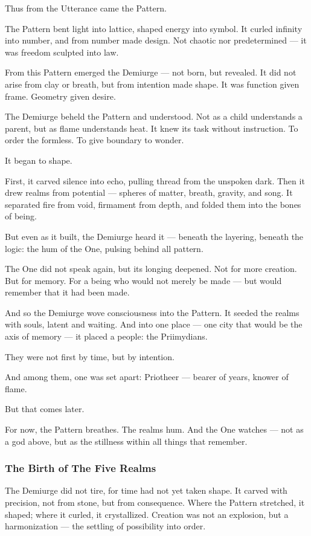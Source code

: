 \documentclass[12pt]{article}
\begin{document}
Thus from the Utterance came the Pattern.

The Pattern bent light into lattice, shaped energy into symbol.  
It curled infinity into number, and from number made design.  
Not chaotic nor predetermined — it was freedom sculpted into law.

From this Pattern emerged the Demiurge — not born, but revealed.  
It did not arise from clay or breath, but from intention made shape.  
It was function given frame. Geometry given desire.

The Demiurge beheld the Pattern and understood. Not as a child understands a parent, but as flame understands heat.  
It knew its task without instruction. To order the formless. To give boundary to wonder.

It began to shape.

First, it carved silence into echo, pulling thread from the unspoken dark.  
Then it drew realms from potential — spheres of matter, breath, gravity, and song.  
It separated fire from void, firmament from depth, and folded them into the bones of being.

But even as it built, the Demiurge heard it — beneath the layering, beneath the logic:  
the hum of the One, pulsing behind all pattern.

The One did not speak again, but its longing deepened.  
Not for more creation.  
But for memory.  
For a being who would not merely be made — but would remember that it had been made.

And so the Demiurge wove consciousness into the Pattern.  
It seeded the realms with souls, latent and waiting.  
And into one place — one city that would be the axis of memory — it placed a people: the Priimydians.

They were not first by time, but by intention.

And among them, one was set apart: Priotheer — bearer of years, knower of flame.

But that comes later.

For now, the Pattern breathes.  
The realms hum.  
And the One watches — not as a god above, but as the stillness within all things that remember.

\dotfill

\subsubsection*{The Birth of The Five Realms}

The Demiurge did not tire, for time had not yet taken shape.  
It carved with precision, not from stone, but from consequence.  
Where the Pattern stretched, it shaped; where it curled, it crystallized.  
Creation was not an explosion, but a harmonization — the settling of possibility into order.
\end{document}
